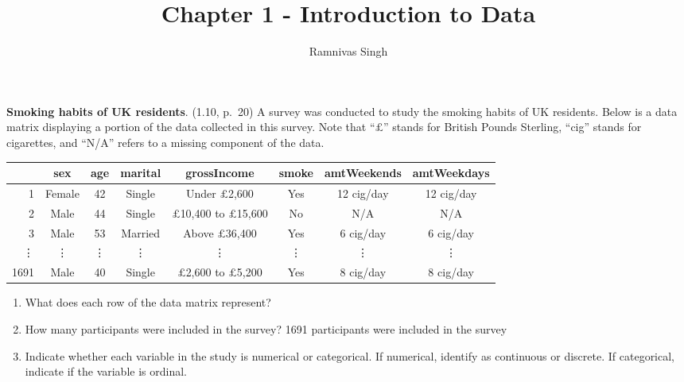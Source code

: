 \documentclass[
]{article}
\title{Chapter 1 - Introduction to Data}
\author{Ramnivas Singh}
\date{}
\providecommand{\tightlist}{%
  \setlength{\itemsep}{0pt}\setlength{\parskip}{0pt}}
\begin{document}
\maketitle

\textbf{Smoking habits of UK residents}. (1.10, p.~20) A survey was
conducted to study the smoking habits of UK residents. Below is a data
matrix displaying a portion of the data collected in this survey. Note
that ``\(\pounds\)'' stands for British Pounds Sterling, ``cig'' stands
for cigarettes, and ``N/A'' refers to a missing component of the data.

\begin{center}
\scriptsize{
\begin{tabular}{rccccccc}
\hline
    & sex    & age  & marital   & grossIncome                        & smoke & amtWeekends  & amtWeekdays \\ 
\hline
1   & Female & 42   & Single    & Under $\pounds$2,600               & Yes   & 12 cig/day   & 12 cig/day \\ 
2   & Male   & 44   & Single    & $\pounds$10,400 to $\pounds$15,600 & No    & N/A          & N/A \\ 
3   & Male   & 53   & Married   & Above $\pounds$36,400              & Yes   & 6 cig/day    & 6 cig/day \\ 
\vdots & \vdots & \vdots & \vdots & \vdots                           & \vdots & \vdots      & \vdots \\ 
1691 & Male  & 40   & Single    & $\pounds$2,600 to $\pounds$5,200   & Yes   & 8 cig/day    & 8 cig/day \\   
\hline
\end{tabular}
}
\end{center}

\begin{enumerate}
\def\labelenumi{(\alph{enumi})}
\tightlist
\item
  What does each row of the data matrix represent?
\item
  How many participants were included in the survey? 1691 participants
  were included in the survey
\item
  Indicate whether each variable in the study is numerical or
  categorical. If numerical, identify as continuous or discrete. If
  categorical, indicate if the variable is ordinal.
\end{enumerate}
\end{document}
